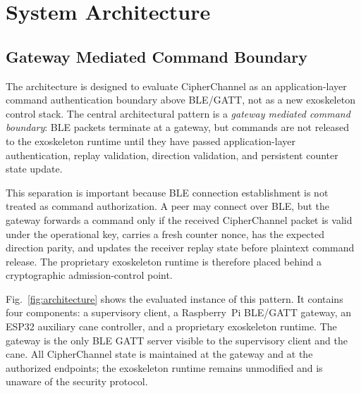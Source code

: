 \documentclass[journal]{IEEEtran}
\begin{document}
\section{System Architecture}
\label{sec:sysarch}

\subsection{Gateway Mediated Command Boundary}

The architecture is designed to evaluate CipherChannel as an application-layer command authentication boundary above BLE/GATT, not as a new exoskeleton control stack. The central architectural pattern is a \emph{gateway mediated command boundary}: BLE packets terminate at a gateway, but commands are not released to the exoskeleton runtime until they have passed application-layer authentication, replay validation, direction validation, and persistent counter state update.

This separation is important because BLE connection establishment is not treated as command authorization. A peer may connect over BLE, but the gateway forwards a command only if the received CipherChannel packet is valid under the operational key, carries a fresh counter nonce, has the expected direction parity, and updates the receiver replay state before plaintext command release. The proprietary exoskeleton runtime is therefore placed behind a cryptographic admission-control point.

Fig.~\ref{fig:architecture} shows the evaluated instance of this pattern. It contains four components: a supervisory client, a Raspberry~Pi BLE/GATT gateway, an ESP32 auxiliary cane controller, and a proprietary exoskeleton runtime. The gateway is the only BLE GATT server visible to the supervisory client and the cane. All CipherChannel state is maintained at the gateway and at the authorized endpoints; the exoskeleton runtime remains unmodified and is unaware of the security protocol.
\end{document}
